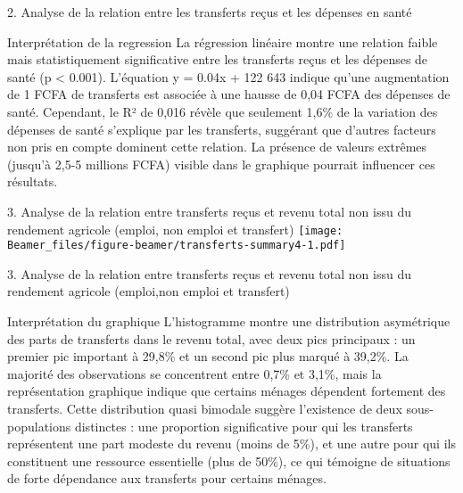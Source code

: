 \documentclass[
  11pt,
  ignorenonframetext,
]{beamer}
\begin{document}
\begin{frame}{2. Analyse de la relation entre les transferts reçus et
les dépenses en santé}
\label{analyse-de-la-relation-entre-les-transferts-reuxe7us-et-les-duxe9penses-en-santuxe9-1}
\begin{block}{Interprétation de la regression}
\label{interpruxe9tation-de-la-regression-1}
La régression linéaire montre une relation faible mais statistiquement
significative entre les transferts reçus et les dépenses de santé (p
\textless{} 0.001). L'équation y = 0.04x + 122 643 indique qu'une
augmentation de 1 FCFA de transferts est associée à une hausse de 0,04
FCFA des dépenses de santé. Cependant, le R² de 0,016 révèle que
seulement 1,6\% de la variation des dépenses de santé s'explique par les
transferts, suggérant que d'autres facteurs non pris en compte dominent
cette relation. La présence de valeurs extrêmes (jusqu'à 2,5-5 millions
FCFA) visible dans le graphique pourrait influencer ces résultats.
\end{block}
\end{frame}

\begin{frame}{3. Analyse de la relation entre transferts reçus et revenu
total non issu du rendement agricole (emploi, non emploi et transfert)}
\label{analyse-de-la-relation-entre-transferts-reuxe7us-et-revenu-total-non-issu-du-rendement-agricole-emploi-non-emploi-et-transfert}
\texttt{[image: Beamer\_files/figure-beamer/transferts-summary4-1.pdf]}
\end{frame}

\begin{frame}{3. Analyse de la relation entre transferts reçus et revenu
total non issu du rendement agricole (emploi,non emploi et transfert)}
\label{analyse-de-la-relation-entre-transferts-reuxe7us-et-revenu-total-non-issu-du-rendement-agricole-emploinon-emploi-et-transfert}
\begin{block}{Interprétation du graphique}
\label{interpruxe9tation-du-graphique-1}
L'histogramme montre une distribution asymétrique des parts de
transferts dans le revenu total, avec deux pics principaux : un premier
pic important à 29,8\% et un second pic plus marqué à 39,2\%. La
majorité des observations se concentrent entre 0,7\% et 3,1\%, mais la
représentation graphique indique que certains ménages dépendent
fortement des transferts. Cette distribution quasi bimodale suggère
l'existence de deux sous-populations distinctes : une proportion
significative pour qui les transferts représentent une part modeste du
revenu (moins de 5\%), et une autre pour qui ils constituent une
ressource essentielle (plus de 50\%), ce qui témoigne de situations de
forte dépendance aux transferts pour certains ménages.
\end{block}
\end{frame}
\end{document}
